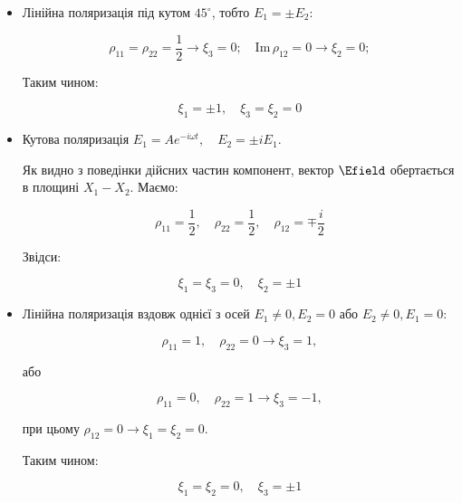 \begin{itemize}

\item Лінійна поляризація під кутом $45^{\circ}$, тобто \(E_1 = \pm E_2\):

\begin{equation*}
\rho_{11} = \rho_{22} = \frac{1}{2} \rightarrow \xi_3 = 0; \quad \text{Im} \, \rho_{12} = 0 \rightarrow \xi_2 = 0;
\end{equation*}

Таким чином:

\begin{equation*}
\xi_1 = \pm 1, \quad \xi_3 = \xi_2 = 0
\end{equation*}



\item  Кутова поляризація \(E_1 = A e^{-i\omega t}, \quad E_2 = \pm i E_1\).

Як видно з поведінки дійсних частин компонент, вектор \(\Efield\) обертається в площині \(X_1 -
X_2\). Маємо:

\begin{equation*}
\rho_{11} = \frac{1}{2}, \quad \rho_{22} = \frac{1}{2}, \quad \rho_{12} = \mp \frac{i}{2}
\end{equation*}

Звідси:

\begin{equation*}
\xi_1 = \xi_3 = 0, \quad \xi_2 = \pm 1
\end{equation*}

\item Лінійна поляризація вздовж однієї з осей \(E_1 \neq 0, E_2 = 0\) або \(E_2 \neq 0, E_1 = 0\):

\begin{equation*}
\rho_{11} = 1, \quad \rho_{22} = 0 \rightarrow \xi_3 = 1,
\end{equation*}

або

\begin{equation*}
\rho_{11} = 0, \quad \rho_{22} = 1 \rightarrow \xi_3 = -1,
\end{equation*}

при цьому \(\rho_{12} = 0 \rightarrow \xi_1 = \xi_2 = 0\).

Таким чином:

\begin{equation*}
\xi_1 = \xi_2 = 0, \quad \xi_3 = \pm 1
\end{equation*}

\end{itemize}

